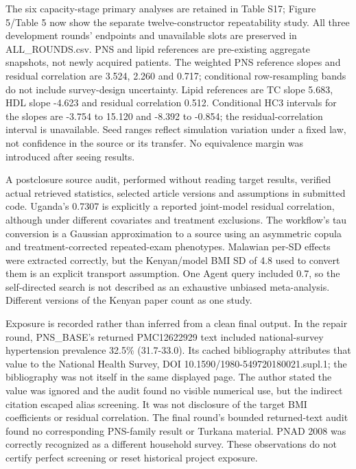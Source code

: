 \documentclass[11pt,letterpaper]{article}
\begin{document}
The six capacity-stage primary analyses are retained in Table S17; Figure 5/\allowbreak{}Table 5 now show the separate twelve-constructor repeatability study. All three development rounds' endpoints and unavailable slots are preserved in ALL\_ROUNDS.csv. PNS and lipid references are pre-existing aggregate snapshots, not newly acquired patients. The weighted PNS reference slopes and residual correlation are 3.524, 2.260 and 0.717; conditional row-resampling bands do not include survey-design uncertainty. Lipid references are TC slope 5.683, HDL slope -4.623 and residual correlation 0.512. Conditional HC3 intervals for the slopes are -3.754 to 15.120 and -8.392 to -0.854; the residual-correlation interval is unavailable. Seed ranges reflect simulation variation under a fixed law, not confidence in the source or its transfer. No equivalence margin was introduced after seeing results.


A postclosure source audit, performed without reading target results, verified actual retrieved statistics, selected article versions and assumptions in submitted code. Uganda's 0.7307 is explicitly a reported joint-model residual correlation, although under different covariates and treatment exclusions. The workflow's tau conversion is a Gaussian approximation to a source using an asymmetric copula and treatment-corrected repeated-exam phenotypes. Malawian per-SD effects were extracted correctly, but the Kenyan/\allowbreak{}model BMI SD of 4.8 used to convert them is an explicit transport assumption. One Agent query included 0.7, so the self-directed search is not described as an exhaustive unbiased meta-analysis. Different versions of the Kenyan paper count as one study.


Exposure is recorded rather than inferred from a clean final output. In the repair round, PNS\_BASE's returned PMC12622929 text included national-survey hypertension prevalence 32.5\% (31.7-33.0). Its cached bibliography attributes that value to the National Health Survey, DOI 10.1590/\allowbreak{}1980-549720180021.supl.1; the bibliography was not itself in the same displayed page. The author stated the value was ignored and the audit found no visible numerical use, but the indirect citation escaped alias screening. It was not disclosure of the target BMI coefficients or residual correlation. The final round's bounded returned-text audit found no corresponding PNS-family result or Turkana material. PNAD 2008 was correctly recognized as a different household survey. These observations do not certify perfect screening or reset historical project exposure.
\end{document}

